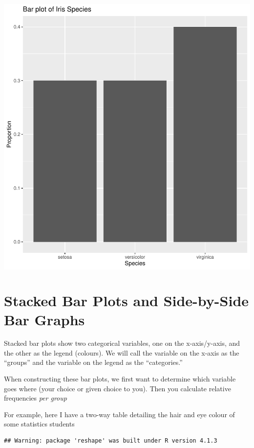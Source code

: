 \documentclass[
]{book}
\begin{document}
\includegraphics{_main_files/figure-latex/unnamed-chunk-6-1.pdf}

\hypertarget{stacked-bar-plots-and-side-by-side-bar-graphs}{%
\section{Stacked Bar Plots and Side-by-Side Bar Graphs}\label{stacked-bar-plots-and-side-by-side-bar-graphs}}

Stacked bar plots show two categorical variables, one on the
x-axis/y-axis, and the other as the legend (colours). We will call the
variable on the x-axis as the ``groups'' and the variable on the legend as
the ``categories.''

When constructing these bar plots, we first want to determine which
variable goes where (your choice or given choice to you). Then you
calculate relative frequencies \emph{per group}

For example, here I have a two-way table detailing the hair and eye
colour of some statistics students

\begin{verbatim}
## Warning: package 'reshape' was built under R version 4.1.3
\end{verbatim}
\end{document}
